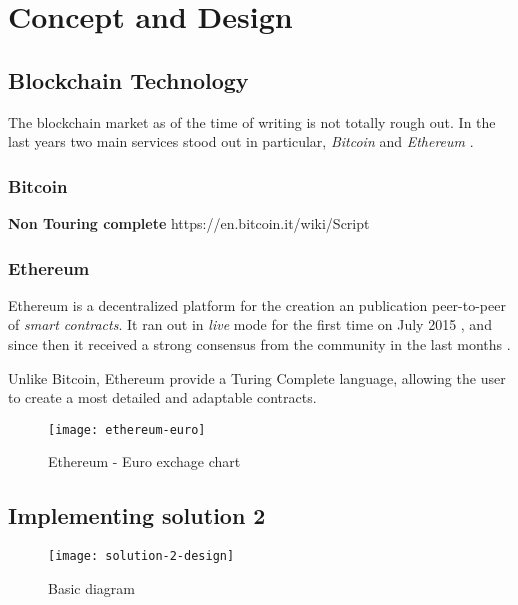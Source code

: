 \chapter{Concept and Design}
\label{chapter:concept}


\section{Blockchain Technology}

The blockchain market as of the time of writing is not totally rough out. In the last years two main services stood out in particular, \textit{Bitcoin} \citep{BitcoinMainPage} and \textit{Ethereum} \citep{EthereumMainPage}.

\subsection{Bitcoin}

\textbf{Non Touring complete} https://en.bitcoin.it/wiki/Script


\subsection{Ethereum}
Ethereum is a decentralized platform for the creation an publication peer-to-peer of \textit{smart contracts}.
It ran out in \textit{live} mode for the first time on July 2015 \citep{EthereumLaunch}, and since then it received a strong consensus from the community in the last months \citep{EthereumEuroChart}.

Unlike Bitcoin, Ethereum provide a Turing Complete language, allowing the user to create a most detailed and adaptable contracts.

\begin{figure}[ht]
  \vspace{2em}
	\centering
  \texttt{[image: ethereum-euro]}
	\caption{Ethereum - Euro exchage chart}
	\label{fig1}
\end{figure}

\section{Implementing solution 2}

\begin{figure}[ht]
  \vspace{2em}
	\centering
  \texttt{[image: solution-2-design]}
	\caption{Basic diagram}
	\label{fig1}
\end{figure}